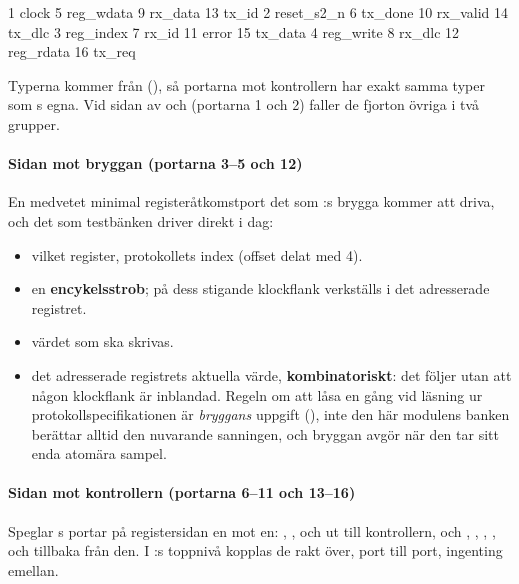 \begin{textdrawing}
 1 clock        5 reg_wdata    9 rx_data     13 tx_id
 2 reset_s2_n   6 tx_done     10 rx_valid    14 tx_dlc
 3 reg_index    7 rx_id       11 error       15 tx_data
 4 reg_write    8 rx_dlc      12 reg_rdata   16 tx_req
\end{textdrawing}

Typerna kommer från  (), så portarna mot kontrollern har
exakt samma typer som s egna. Vid sidan av  och 
(portarna 1 och 2) faller de fjorton övriga i två grupper.

\paragraph{Sidan mot bryggan (portarna 3--5 och 12)}
En medvetet minimal registeråtkomstport \textemdash{} det som :s brygga kommer att
driva, och det som testbänken driver direkt i dag:
\begin{itemize}
  \item {} \textemdash{} vilket register, protokollets
    index (offset delat med 4).
  \item {} \textemdash{} en \textbf{encykelsstrob}; på dess stigande
    klockflank verkställs  i det adresserade registret.
  \item {} \textemdash{} värdet som ska skrivas.
  \item {} \textemdash{} det adresserade registrets
    aktuella värde, \textbf{kombinatoriskt}: det följer  utan att någon klockflank är
    inblandad. Regeln om att låsa en gång vid läsning ur protokollspecifikationen är \emph{bryggans}
    uppgift (), inte den här modulens \textemdash{} banken berättar alltid den
    nuvarande sanningen, och bryggan avgör när den tar sitt enda atomära sampel.
\end{itemize}

\paragraph{Sidan mot kontrollern (portarna 6--11 och 13--16)}
Speglar s portar på registersidan en mot en: , ,
 och  ut till kontrollern, och , ,
, ,  och  tillbaka från den. I
:s toppnivå kopplas de rakt över, port till port, ingenting emellan.

